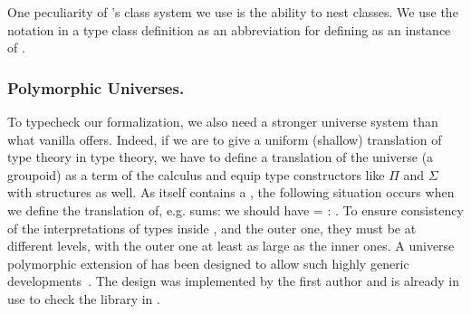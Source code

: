 One peculiarity of \Coq's class system we use is the ability to nest
classes. We use the  \coqcode{:>}  notation in a type class
definition   as an abbreviation for
defining  as an instance of .

\subsubsection{Polymorphic Universes.}
\label{sec:polym-univ}
\def\Types{\coqdockw{Type}s\xspace}


To typecheck our formalization, we also need a stronger universe system
than what vanilla \Coq offers. Indeed, if we are to give a uniform
(shallow) translation of type theory in type theory, we have to define a
translation of the \type{} universe (a groupoid) as a term of
the calculus and equip type constructors like $Π$ and $Σ$ with
\interp{\type{}} structures as well. As \interp{\type{}} itself contains
a \Type{}, the following situation occurs when we define the translation
of, e.g. sums: we should have  =  
 : \interp{\type}. To ensure consistency of the
interpretations of types inside ,  and the outer
one, they must be at different levels, with the outer one at least as
large as the inner ones. A universe polymorphic extension of \Coq has
been designed to allow such highly generic
developments~\cite{sozeau.Coq/univs/ITP14}.  The design was implemented
by the first author and is already in use to check the 
library in \Coq \cite{HoTT/HoTT}.

